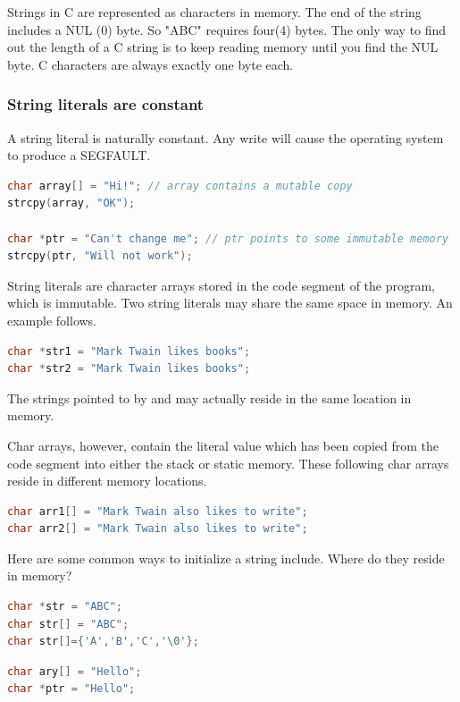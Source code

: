 Strings in C are represented as characters in memory.
The end of the string includes a NUL (0) byte.
So "ABC" requires four(4) bytes.
The only way to find out the length of a C string is to keep reading memory until you find the NUL byte.
C characters are always exactly one byte each.

\subsubsection{String literals are constant}

A string literal is naturally constant.
Any write will cause the operating system to produce a SEGFAULT. 

\begin{lstlisting}[language=C]
char array[] = "Hi!"; // array contains a mutable copy
strcpy(array, "OK");

char *ptr = "Can't change me"; // ptr points to some immutable memory
strcpy(ptr, "Will not work");
\end{lstlisting}

String literals are character arrays stored in the code segment of the program, which is immutable.
Two string literals may share the same space in memory.
An example follows.

\begin{lstlisting}[language=C]
char *str1 = "Mark Twain likes books";
char *str2 = "Mark Twain likes books";
\end{lstlisting}

The strings pointed to by  and  may actually reside in the same location in memory.

Char arrays, however, contain the literal value which has been copied from the code segment into either the stack or static memory.
These following char arrays reside in different memory locations.

\begin{lstlisting}[language=C]
char arr1[] = "Mark Twain also likes to write";
char arr2[] = "Mark Twain also likes to write";
\end{lstlisting}

Here are some common ways to initialize a string include. Where do they reside in memory?

\begin{lstlisting}[language=C]
char *str = "ABC";
char str[] = "ABC";
char str[]={'A','B','C','\0'};
\end{lstlisting}

\begin{lstlisting}[language=C]
char ary[] = "Hello";
char *ptr = "Hello";
\end{lstlisting}

